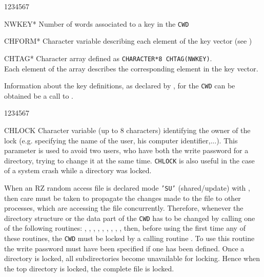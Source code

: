 
\Odesc
\begin{DLtt}{1234567}
\item[NWKEY*]Number of words associated to a key in the {\tt CWD}
\item[CHFORM*]Character variable describing each element of the key vector
(see )
\item[CHTAG*]Character array defined as {\tt CHARACTER*8 CHTAG(NWKEY)}.\\
Each element of the array describes the corresponding
element in the key vector.
\end{DLtt}

Information about the key definitions, as declared by ,
for the {\tt CWD} can be obtained be a call to .


\begin{DLtt}{1234567}
\item[CHLOCK]Character variable (up to 8 characters) identifying the owner
of the lock (e.g.
specifying the name of the user, his computer identifier,...).
This parameter is used to avoid two users, who have both the
write password for a directory, trying to change it at the same time.
{\tt CHLOCK} is also useful in the case of a system crash while a directory
was locked.
\end{DLtt}

When an RZ random access file is declared mode {\tt'SU'} (shared/update)
with  , then care must be taken to propagate the changes made
to the file to other processes, which are accessing the file
concurrently. Therefore, whenever the
directory structure or the data part of the {\tt CWD} has to be changed by
calling one of the following routines:
, , , ,
, , , , ,
then, before using the first time any of these routines,
the {\tt CWD} must be locked by a calling routine .
To use this routine the write
password must have been specified if one has been defined.
Once a directory is locked, all
subdirectories become unavailable for locking. Hence when the top
directory is locked, the complete file is locked.


